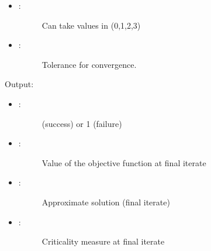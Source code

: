 \documentclass[a4paper,10pt,english]{sphinxmanual}
\begin{document}
\begin{fulllineitems}
\begin{itemize}
\begin{description}
\begin{description}
\begin{itemize}
\begin{description}
\end{description}

\item {} \begin{description}
\item[{: }] \leavevmode
Can take values in (0,1,2,3)

\end{description}

\item {} \begin{description}
\item[{: }] \leavevmode
Tolerance for convergence.

\end{description}

\end{itemize}

\end{description}

\end{description}

\end{itemize}

Output:
\begin{itemize}
\item {} \begin{description}
\item[{: }]  (success) or 1 (failure)

\end{description}

\item {} \begin{description}
\item[{: }] \leavevmode
Value of the objective function at final iterate

\end{description}

\item {} \begin{description}
\item[{: }] \leavevmode
Approximate solution (final iterate)

\end{description}

\item {} \begin{description}
\item[{: }] \leavevmode
Criticality measure at final iterate


\end{description}
\end{itemize}
\end{fulllineitems}
\end{document}
